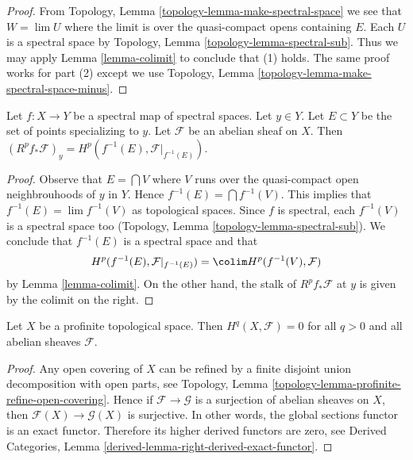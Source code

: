 \begin{proof}
From Topology, Lemma \ref{topology-lemma-make-spectral-space}
we see that $W = \lim U$ where the limit is over the quasi-compact
opens containing $E$. Each $U$ is a spectral space by
Topology, Lemma \ref{topology-lemma-spectral-sub}.
Thus we may apply Lemma \ref{lemma-colimit} to conclude that (1) holds.
The same proof works for part (2) except we use
Topology, Lemma \ref{topology-lemma-make-spectral-space-minus}.
\end{proof}

\begin{lemma}
\label{lemma-proper-base-change-spectral}
Let $f : X \to Y$ be a spectral map of spectral spaces. Let $y \in Y$.
Let $E \subset Y$ be the set of points specializing to $y$.
Let $\mathcal{F}$ be an abelian sheaf on $X$.
Then $(R^pf_*\mathcal{F})_y = H^p(f^{-1}(E), \mathcal{F}|_{f^{-1}(E)})$.
\end{lemma}

\begin{proof}
Observe that $E = \bigcap V$ where $V$ runs over the quasi-compact
open neighbrouhoods of $y$ in $Y$. Hence $f^{-1}(E) = \bigcap f^{-1}(V)$.
This implies that $f^{-1}(E) = \lim f^{-1}(V)$ as topological spaces.
Since $f$ is spectral, each $f^{-1}(V)$ is a spectral space too
(Topology, Lemma \ref{topology-lemma-spectral-sub}).
We conclude that $f^{-1}(E)$ is a spectral space and that
$$
H^p(f^{-1}(E), \mathcal{F}|_{f^{-1}(E)}) =
\colim H^p(f^{-1}(V), \mathcal{F})
$$
by Lemma \ref{lemma-colimit}. On the other hand, the stalk of
$R^pf_*\mathcal{F}$ at $y$ is given by the colimit on the right.
\end{proof}

\begin{lemma}
\label{lemma-vanishing-for-profinite}
Let $X$ be a profinite topological space. Then $H^q(X, \mathcal{F}) = 0$
for all $q > 0$ and all abelian sheaves $\mathcal{F}$.
\end{lemma}

\begin{proof}
Any open covering of $X$ can be refined by a finite disjoint union
decomposition with open parts, see
Topology, Lemma \ref{topology-lemma-profinite-refine-open-covering}.
Hence if $\mathcal{F} \to \mathcal{G}$ is a surjection of abelian
sheaves on $X$, then $\mathcal{F}(X) \to \mathcal{G}(X)$ is surjective.
In other words, the global sections functor is an exact functor.
Therefore its higher derived functors are zero, see
Derived Categories, Lemma \ref{derived-lemma-right-derived-exact-functor}.
\end{proof}

